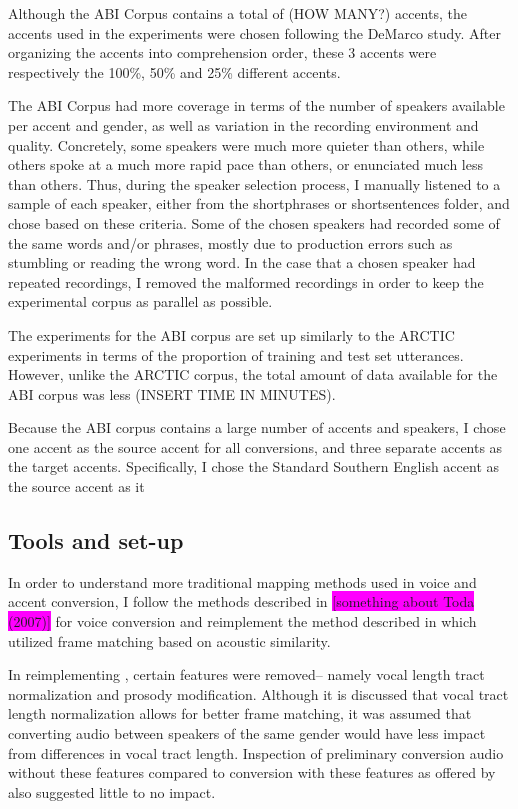 \documentclass
[
    a4paper,
    twoside,
    12pt,
]
{report}
\begin{document}
Although the ABI Corpus contains a total of (HOW MANY?) accents, the
accents used in the experiments were chosen following the DeMarco study.
After organizing the accents into comprehension order, these 3 accents
were respectively the 100\%, 50\% and 25\% different accents.

The ABI Corpus had more coverage in terms of the number of speakers
available per accent and gender, as well as variation in the recording
environment and quality. Concretely, some speakers were much more
quieter than others, while others spoke at a much more rapid pace than
others, or enunciated much less than others. Thus, during the speaker
selection process, I manually listened to a sample of each speaker,
either from the shortphrases or shortsentences folder, and chose based
on these criteria. Some of the chosen speakers had recorded some of the
same words and/or phrases, mostly due to production errors such as
stumbling or reading the wrong word. In the case that a chosen speaker
had repeated recordings, I removed the malformed recordings in order to
keep the experimental corpus as parallel as possible.

The experiments for the ABI corpus are set up similarly to the ARCTIC
experiments in terms of the proportion of training and test set
utterances. However, unlike the ARCTIC corpus, the total amount of data
available for the ABI corpus was less (INSERT TIME IN MINUTES).

Because the ABI corpus contains a large number of accents and speakers,
I chose one accent as the source accent for all conversions, and three
separate accents as the target accents. Specifically, I chose the
Standard Southern English accent as the source accent as it

\hypertarget{tools-and-set-up}{%
\subsection{Tools and set-up}\label{tools-and-set-up}}

In order to understand more traditional mapping methods used in voice
and accent conversion, I follow the methods described in
\colorbox{magenta}{[something about Toda (2007)]} for voice conversion
and reimplement the method described in \textcite{aryal2014} which
utilized frame matching based on acoustic similarity.

In reimplementing \textcite{aryal2014}, certain features were removed--
namely vocal length tract normalization and prosody modification.
Although it is discussed that vocal tract length normalization allows
for better frame matching, it was assumed that converting audio between
speakers of the same gender would have less impact from differences in
vocal tract length. Inspection of preliminary conversion audio without
these features compared to conversion with these features as offered by
\textcite{zhao2018a} also suggested little to no impact.
\end{document}
